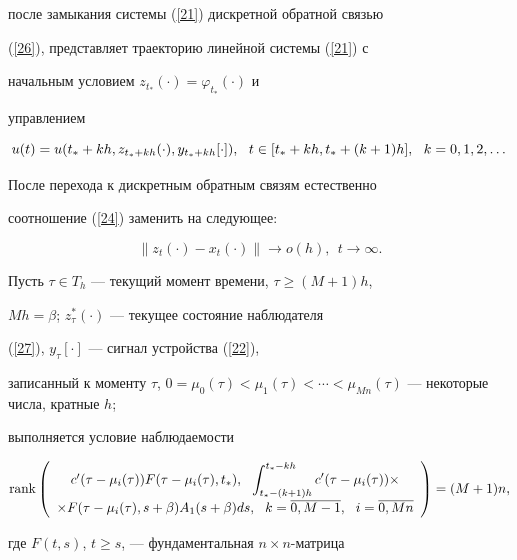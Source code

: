 после замыкания системы (\ref{21}) дискретной обратной связью


(\ref{26}), представляет траекторию линейной системы (\ref{21}) с


начальным условием $z_{t_*}(\cdot) = \varphi_{t_*}(\cdot)$ и


управлением


$$


u(t)=u(t_*+kh, z_{t_*+kh}(\cdot), y_{t_{*}+kh}[\cdot]),\ \ t \in


[t_*+kh, t_*+(k+1)h],\tts{[} \ \ k=0,1,2, \dotsc


$$





После перехода к дискретным обратным связям естественно


соотношение (\ref{24}) заменить на следующее:


$$


\|z_t(\cdot) - x_t(\cdot)\| \rightarrow o(h),\ \ t \rightarrow\infty.


$$





Пусть $\tau \in T_h$ --- текущий момент времени, $\tau \ge (M+1)h$,


$Mh=\beta$; $z_{\tau}^*(\cdot)$ --- текущее состояние наблюдателя


(\ref{27}), $y_{\tau}[\cdot]$ --- сигнал устройства (\ref{22}),


записанный к моменту $\tau$, $0=\mu_0(\tau)<


\mu_1(\tau)<\dotsb<\mu_{Mn}(\tau)$ --- некоторые числа, кратные $h$;


выполняется условие наблюдаемости


$$


\rank \left(


\begin{array}{c}


c'(\tau-\mu_{i}(\tau))F(\tau-\mu_i(\tau), t_*),


\ \ \displaystyle\int_{t_*-(k+1)h}^{t_*-kh}c'(\tau-\mu_i(\tau))


\times \\[3mm] \times F(\tau-\mu_i(\tau),s+\beta)


A_1(s+\beta)ds,\ \ k=\overline{0,M-1},\ \ i=\overline{0,Mn}


\end{array} \right) =(M+1)n,


$$


где $F(t,s)$, $t \ge s$, --- фундаментальная $n \times n$-матрица


